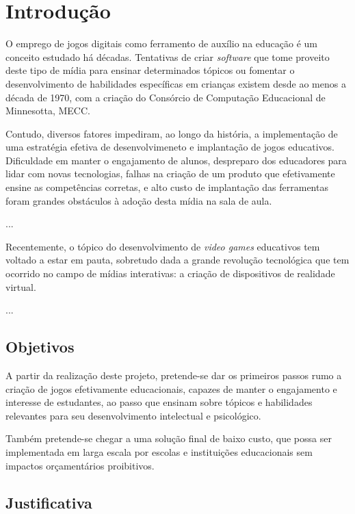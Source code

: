 \chapter{Introdução}

O emprego de jogos digitais como ferramento de auxílio na educação é um conceito estudado há décadas. Tentativas de criar \textit{software} que tome proveito deste tipo de mídia para ensinar determinados tópicos ou fomentar o desenvolvimento de habilidades específicas em crianças existem desde ao menos a década de 1970, com a criação do Consórcio de Computação Educacional de Minnesotta, MECC.

Contudo, diversos fatores impediram, ao longo da história, a implementação de uma estratégia efetiva de desenvolvimeneto e implantação de jogos educativos. Dificuldade em manter o engajamento de alunos, despreparo dos educadores para lidar com novas tecnologias, falhas na criação de um produto que efetivamente ensine as competências corretas, e alto custo de implantação das ferramentas foram grandes obstáculos à adoção desta mídia na sala de aula. 

...

Recentemente, o tópico do desenvolvimento de \textit{video games} educativos tem voltado a estar em pauta, sobretudo dada a grande revolução tecnológica que tem ocorrido no campo de mídias interativas: a criação de dispositivos de realidade virtual.

...

\section{Objetivos}\label{sec-objetivos}

A partir da realização deste projeto, pretende-se dar os primeiros passos rumo a criação de jogos efetivamente educacionais, capazes de manter o engajamento e interesse de estudantes, ao passo que ensinam sobre tópicos e habilidades relevantes para seu desenvolvimento intelectual e psicológico.

Também pretende-se chegar a uma solução final de baixo custo, que possa ser implementada em larga escala por escolas e instituições educacionais sem impactos orçamentários proibitivos.



\section{Justificativa}\label{sec-justificativas}

